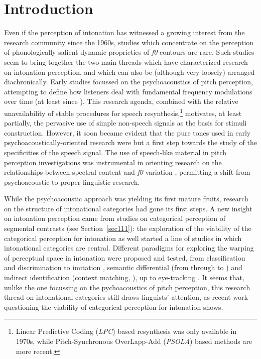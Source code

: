 \section{Introduction}\label{sec31}
Even if the perception of intonation has witnessed a growing interest from the research community since the 1960s, studies which concentrate on the perception of phonologically salient dynamic proprieties of \textit{f0} contours are rare. Such studies seem to bring together the two main threads which have characterized research on intonation perception, and which can also be (although very loosely) arranged diachronically. Early studies focussed on the psychoacoustics of pitch perception, attempting to define how listeners deal with fundamental frequency modulations over time (at least since \citealt{sergeant1962sensitivity}). This research agenda, combined with the relative unavailability of stable procedures for speech resynthesis,\footnote{Linear Predictive Coding (\textit{LPC}) based resynthesis was only available in 1970s, while Pitch-Synchronous OverLapp-Add (\textit{PSOLA}) based methods are more recent.} motivates, at least partially, the pervasive use of simple non-speech signals as the basis for stimuli construction. However, it soon became evident that the pure tones used in early psychoacoustically-oriented research were but a first step towards the study of the specificities of the speech signal. The use of speech-like material in pitch perception investigations \citep{rossi1971seuil,klatt1973discrimination,thart1976psychoacoustic,schouten1985identification} was instrumental in orienting research on the relationships between spectral content and \textit{f0} variation \citep{house1990tonal,house1997perceptual}, permitting a shift from psychoacoustic to proper linguistic research.

While the psychoacoustic approach was yielding its first mature fruits, research on the structure of intonational categories had gone its first steps. A new insight on intonation perception came from studies on categorical perception of segmental contrasts (see Section~\ref{sec111}): the exploration of the viability of the categorical perception \citep{kohler1987categorical} for intonation as well started a line of studies in which intonational categories are central. Different paradigms for exploring the warping of perceptual space in intonation were proposed and tested, from classification and discrimination to imitation \citep{pierrehumbert1989categories}, semantic differential (from  \citealt{osgood1957measurement} through \citealt{uldall1964dimensions} to \citealt{kirsner1994interaction}) and indirect identification (context matching, \citealt{nash1980intonation}), up to eye-tracking \citep{dahan2002accent}. It seems that, unlike the one focussing on the pychoacoustics of pitch perception, this research thread on intonational categories still draws linguists' attention, as recent work questioning the viability of categorical perception for intonation \citep{gussenhoven2006experimental,niebuhr2007categorical} shows.

